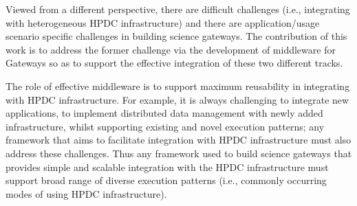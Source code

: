 \documentclass[]{svjour3}
\begin{document}
Viewed from a different perspective, there are difficult challenges (i.e.,
integrating with heterogeneous HPDC infrastructure) and there are
application/usage scenario specific challenges in building science gateways. The
contribution of this work is to address the former challenge via the
development of middleware for Gateways so as to support the effective
integration of these two different tracks.

The role of effective middleware is to support maximum reusability in
integrating with HPDC infrastructure. For example, it is always
challenging to integrate new applications, to implement distributed
data management with newly added infrastructure, whilst supporting
existing and novel execution patterns; any framework that aims to
facilitate integration with HPDC infrastructure must also address
these challenges.  Thus any framework used to build science gateways
that provides simple and scalable integration with the HPDC
infrastructure must support broad range of diverse execution patterns
(i.e., commonly occurring modes of using HPDC infrastructure).





\end{document}
